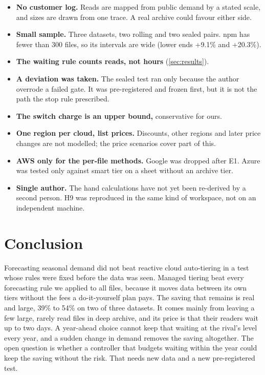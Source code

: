 \documentclass[11pt]{article}
\begin{document}
\begin{itemize}
  \item \textbf{No customer log.} Reads are mapped from public demand by a stated scale, and sizes are drawn from one trace. A real archive could favour either side.
  \item \textbf{Small sample.} Three datasets, two rolling and two sealed pairs. npm has fewer than 300 files, so its intervals are wide (lower ends +9.1\% and +20.3\%).
  \item \textbf{The waiting rule counts reads, not hours} (\cref{sec:results}).
  \item \textbf{A deviation was taken.} The sealed test ran only because the author overrode a failed gate. It was pre-registered and frozen first, but it is not the path the stop rule prescribed.
  \item \textbf{The switch charge is an upper bound,} conservative for ours.
  \item \textbf{One region per cloud, list prices.} Discounts, other regions and later price changes are not modelled; the price scenarios cover part of this.
  \item \textbf{AWS only for the per-file methods.} Google was dropped after E1. Azure was tested only against smart tier on a sheet without an archive tier.
  \item \textbf{Single author.} The hand calculations have not yet been re-derived by a second person. H9 was reproduced in the same kind of workspace, not on an independent machine.
\end{itemize}

\section{Conclusion}

Forecasting seasonal demand did not beat reactive cloud auto-tiering in a test whose rules were fixed before the data was seen. Managed tiering beat every forecasting rule we applied to all files, because it moves data between its own tiers without the fees a do-it-yourself plan pays. The saving that remains is real and large, 39\% to 54\% on two of three datasets. It comes mainly from leaving a few large, rarely read files in deep archive, and its price is that their readers wait up to two days. A year-ahead choice cannot keep that waiting at the rival's level every year, and a sudden change in demand removes the saving altogether. The open question is whether a controller that budgets waiting within the year could keep the saving without the risk. That needs new data and a new pre-registered test.
\end{document}
